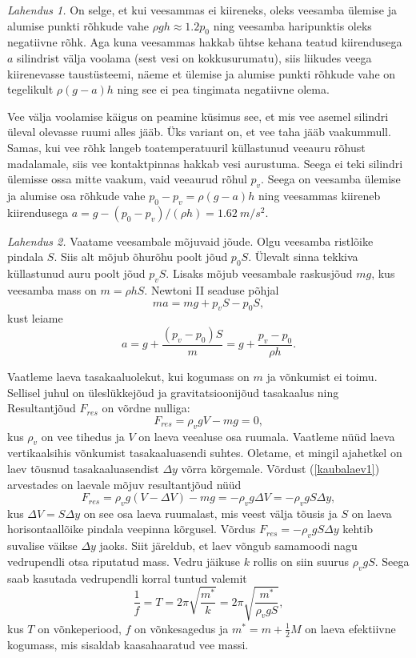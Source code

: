 \documentclass[10pt]{article}
\begin{document}
\solu
\emph{Lahendus 1.} On selge, et kui veesammas ei kiireneks, oleks veesamba ülemise ja alumise punkti rõhkude vahe $\rho gh \approx 1.2p_0$ ning veesamba haripunktis oleks negatiivne rõhk. Aga kuna veesammas hakkab ühtse kehana teatud kiirendusega $a$ silindrist välja voolama (sest vesi on kokkusurumatu), siis liikudes veega kiirenevasse taustüsteemi, näeme et ülemise ja alumise punkti rõhkude vahe on tegelikult $\rho (g - a) h$ ning see ei pea tingimata negatiivne olema.

Vee välja voolamise käigus on peamine küsimus see, et mis vee asemel silindri üleval olevasse ruumi alles jääb. Üks variant on, et vee taha jääb vaakummull. Samas, kui vee rõhk langeb toatemperatuuril küllastunud veeauru rõhust madalamale, siis vee kontaktpinnas hakkab vesi aurustuma. Seega ei teki silindri ülemisse ossa mitte vaakum, vaid veeaurud rõhul $p_v$. Seega on veesamba ülemise ja alumise osa rõhkude vahe $p_0 - p_v = \rho (g - a)h$ ning veesammas kiireneb kiirendusega $a = g - (p_0 - p_v)/(\rho h) = \SI{1.62}{m/s^2}$.

\emph{Lahendus 2.} Vaatame veesambale mõjuvaid jõude. Olgu veesamba ristlõike pindala $S$. Siis alt mõjub õhurõhu poolt jõud $p_0 S$. Ülevalt sinna tekkiva küllastunud auru poolt jõud $p_v S$. Lisaks mõjub veesambale raskusjõud $mg$, kus veesamba mass on $m=\rho hS$. Newtoni II seaduse põhjal
\[
  ma=mg+p_vS-p_0S,
\]
kust leiame
\[
  a=g+\frac{(p_v-p_0)S}{m}=g+\frac{p_v-p_0}{\rho h}.
\]
\probend
\bigskip


\solu
Vaatleme laeva tasakaaluolekut, kui kogumass on $m$ ja võnkumist ei toimu. Sellisel juhul on üleslükkejõud ja gravitatsioonijõud tasakaalus ning Resultantjõud $F_{res}$ on võrdne nulliga:
\begin{equation}
F_{res}=\rho_vgV-mg=0,
\label{kaubalaev1}
\end{equation}
kus $\rho_v$ on vee tihedus ja $V$ on laeva veealuse osa ruumala. Vaatleme nüüd laeva vertikaalsihis võnkumist tasakaaluasendi suhtes. Oletame, et mingil ajahetkel on laev tõusnud tasakaaluasendist $\Delta y$ võrra kõrgemale. Võrdust (\ref{kaubalaev1}) arvestades on laevale mõjuv resultantjõud nüüd
\[F_{res}=\rho_vg(V-\Delta V)-mg=-\rho_vg\Delta V=-\rho_vgS\Delta y,\]
kus $\Delta V=S\Delta y$ on see osa laeva ruumalast, mis veest välja tõusis ja $S$ on laeva horisontaallõike pindala veepinna kõrgusel. Võrdus $F_{res}=-\rho_vgS\Delta y$ kehtib suvalise väikse $\Delta y$ jaoks. Siit järeldub, et laev võngub samamoodi nagu vedrupendli otsa riputatud mass. Vedru jäikuse $k$ rollis on siin suurus $\rho_vgS$. Seega saab kasutada vedrupendli korral tuntud valemit
\[\frac{1}{f}=T=2\pi\sqrt{\frac{m^*}{k}}=2\pi\sqrt{\frac{m^*}{\rho_vgS}},\]
kus $T$ on võnkeperiood, $f$ on võnkesagedus ja $m^*=m+\frac{1}{2}M$ on laeva efektiivne kogumass, mis sisaldab kaasahaaratud vee massi.
\end{document}
